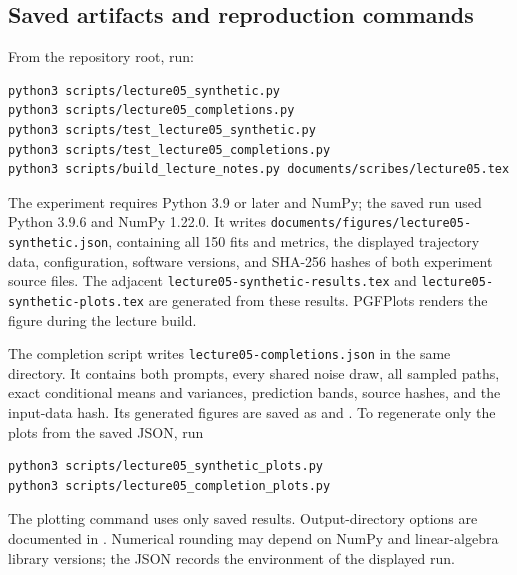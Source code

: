 \documentclass[11pt,twoside]{article}
\theoremstyle{definition}
\theoremstyle{remark}
\begin{document}
\subsection{Saved artifacts and reproduction commands}

From the repository root, run:
\begin{verbatim}
python3 scripts/lecture05_synthetic.py
python3 scripts/lecture05_completions.py
python3 scripts/test_lecture05_synthetic.py
python3 scripts/test_lecture05_completions.py
python3 scripts/build_lecture_notes.py documents/scribes/lecture05.tex
\end{verbatim}
The experiment requires Python 3.9 or later and NumPy; the saved run
used Python 3.9.6 and NumPy 1.22.0. It writes
\texttt{documents/figures/lecture05-synthetic.json}, containing all
150 fits and metrics, the displayed trajectory data, configuration,
software versions, and SHA-256 hashes of both experiment source files.
The adjacent \texttt{lecture05-synthetic-results.tex} and
\texttt{lecture05-synthetic-plots.tex} are generated from these results.
PGFPlots renders the figure during the lecture build.

The completion script writes \texttt{lecture05-completions.json}
in the same directory. It contains both
prompts, every shared noise draw, all sampled paths, exact conditional
means and variances, prediction bands, source hashes, and the input-data
hash. Its generated figures are saved as
 and
.
To regenerate only the plots from the saved JSON, run
\begin{verbatim}
python3 scripts/lecture05_synthetic_plots.py
python3 scripts/lecture05_completion_plots.py
\end{verbatim}
The plotting command uses only saved results. Output-directory options
are documented in .
Numerical rounding may depend on NumPy and linear-algebra
library versions; the JSON records the environment of the displayed run.
\end{document}

